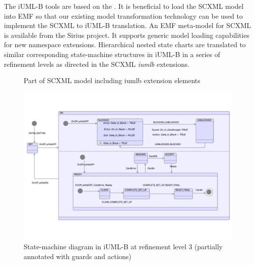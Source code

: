 \documentclass{llncs}
\newcommand{\myfigureshrinker}{\vspace{-1cm}}
\begin{document}
The iUML-B tools are based on the \EMF \cite{steinberg2009emf}. 
It is beneficial to load the SCXML model into EMF so that our existing model transformation technology can be used to implement the SCXML to iUML-B translation. 
An EMF meta-model for SCXML is available from the Sirius \cite{siriuswebsite} project. 
It supports generic model loading capabilities for new namespace extensions.
Hierarchical nested state charts are translated to similar corresponding  state-machine structures in iUML-B in a series of refinement levels as directed in the SCXML \emph{iumlb} extensions.  


\begin{figure}[tb!]
\myfigureshrinker
 \centering
\begin{minipage}[]{.8\textwidth}
          \caption{Part of SCXML model including iumlb extension elements} 
          \label{fig:scxml}
\end{minipage}
\end{figure}

\begin{figure}[tb!]
 \centering
\begin{minipage}[]{.8\textwidth}
  \includegraphics[width=1\textwidth]{caseStudy/TurnstileSimpleModel_iumlb}
  \caption{State-machine diagram in iUML-B at refinement level 3 (partially annotated with guards and actions)}
  \label{fig:StatemachineiUML-B}
\end{minipage}
\end{figure}





\end{document}
